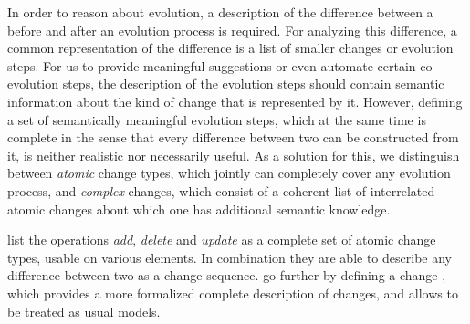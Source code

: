 In order to reason about \metamodel evolution, a description of the difference between a \metamodel before and after an evolution process is required.
For analyzing this difference, a common representation of the difference is a list of smaller changes or evolution steps.
For us to provide meaningful suggestions or even automate certain co-evolution steps, the description of the evolution steps should contain semantic information about the kind of change that is represented by it.
However, defining a set of semantically meaningful evolution steps, which at the same time is complete in the sense that every difference between two \metamodels can be constructed from it, is neither realistic nor necessarily useful.
As a solution for this, we distinguish between \emph{atomic} \metamodel change types, which jointly can completely cover any evolution process, and \emph{complex} changes, which consist of a coherent list of interrelated atomic changes about which one has additional semantic knowledge.

\textcite{khelladi_detecting_2015} list the operations \emph{add}, \emph{delete} and \emph{update} as a complete set of atomic change types, usable on various \metamodel elements.
In combination they are able to describe any difference between two \metamodels as a change sequence.
\textcite{burger_change_2010} go further by defining a change \metamodel, which provides a more formalized complete description of \metamodel changes, and allows \metamodels to be treated as usual models.

